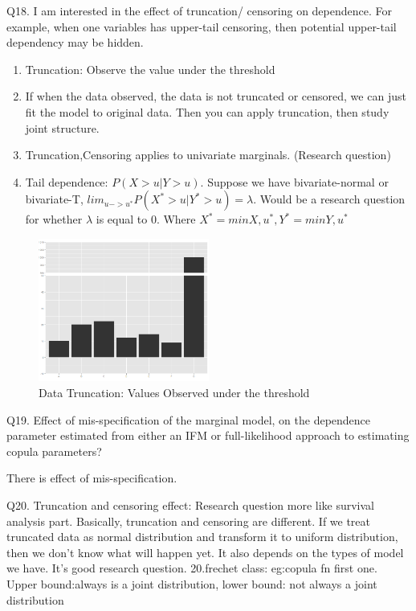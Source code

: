 \documentclass[a4paper,12pt]{texMemo}
\begin{document}
Q18. I am interested in the effect of truncation/ censoring on dependence.
For example, when one variables has upper-tail censoring, then potential upper-tail dependency may be hidden.

\begin{enumerate}
\item Truncation: Observe the value under the threshold
\item If when the data observed, the data is not truncated or censored, we can just fit the model to original data.
Then you can apply truncation, then study joint structure. 
\item Truncation,Censoring applies to univariate marginals. (Research question) 
\item Tail dependence: $P(X>u|Y>u)$. Suppose we have bivariate-normal or bivariate-T,  $lim_{u->u^*}P(X^*>u|Y^*>u)=\lambda$. Would be a research question for whether $\lambda$ is equal to 0. Where $X^*=min{X,u^*},Y^*=min{Y,u^*}$   
\end{enumerate}
\begin{figure}
\centering
\includegraphics[width=0.5\textwidth]{truncate.png}
\caption{\label{fig: Example of Data Truncation} Data Truncation: Values Observed under the threshold}
\end{figure}


Q19. Effect of mis-specification of the marginal model, on the dependence parameter estimated from either an IFM or full-likelihood approach to estimating copula parameters?

There is effect of mis-specification.


Q20. Truncation and censoring effect: Research question more like survival analysis part.
Basically, truncation and censoring are different. If we treat truncated data as normal distribution and transform it to uniform distribution, then we don't know what will happen yet. It also depends on the types of model we have. It's good research question. 
20.frechet class:
eg:copula fn 
first one. 
Upper bound:always is a joint distribution, lower bound: not always a joint distribution


\end{document}
